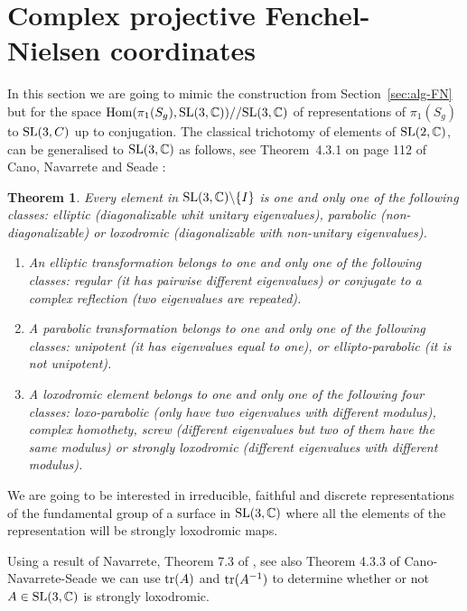 \documentclass[11pt]{amsart}
\newtheorem{theorem}{Theorem}[section]
\numberwithin{equation}{section}
\begin{document}
\section{Complex projective Fenchel-Nielsen coordinates}

    
In this section we are going to mimic the construction from Section~\ref{sec:alg-FN} but for the space
${\rm Hom}(\pi_1(S_g), {\rm SL}(3,\mathbb{C}))// {\rm SL}(3,\mathbb{C})$ of representations of $\pi_1(S_g)$ to
${\rm SL}(3,C)$ up to conjugation. The classical trichotomy of elements of ${\rm SL}(2,\mathbb{C})$, 
can be generalised to ${\rm SL}(3,{\mathbb C})$ as follows, see Theorem~4.3.1 on page 112 of 
Cano, Navarrete and Seade \cite{C-N-S}:

\begin{theorem} \label{thm-SL3C-class}
Every element in ${\rm SL}(3,\mathbb{C})\backslash\{I\}$ is one and only one of the following classes: 
elliptic (diagonalizable whit unitary eigenvalues), parabolic (non-diagonalizable) or 
loxodromic (diagonalizable with non-unitary eigenvalues).
	\begin{enumerate}		
		\item [(i)] An elliptic transformation belongs to one and only one of the following classes: regular (it has pairwise 
		different eigenvalues) or conjugate to a complex reflection (two eigenvalues are repeated).		
		\item [(ii)] A parabolic transformation  belongs to one and only one of the following classes: unipotent 
		(it has eigenvalues equal to one), or ellipto-parabolic (it is not unipotent).
		
		\item [(iii)] A loxodromic element belongs to one and only one of the following four classes: 
		loxo-parabolic (only have two eigenvalues with different modulus), complex homothety, 
		screw (different eigenvalues but two of them have the same modulus) or strongly loxodromic 
		(different eigenvalues with different modulus).
	\end{enumerate}
\end{theorem}

We are going to be interested in irreducible, faithful and discrete representations of the fundamental group of a surface in 
${\rm SL}(3,\mathbb{C})$ where all the elements of the representation will be strongly loxodromic maps.
 
 Using a result of Navarrete, Theorem 7.3 of \cite{Nav}, see also Theorem 4.3.3 of Cano-Navarrete-Seade \cite{C-N-S}
we can use ${\rm tr}(A)$ and ${\rm tr}(A^{-1})$ to determine whether or not
$A\in{\rm SL}(3,{\mathbb C})$ is strongly loxodromic. 
\end{document}
